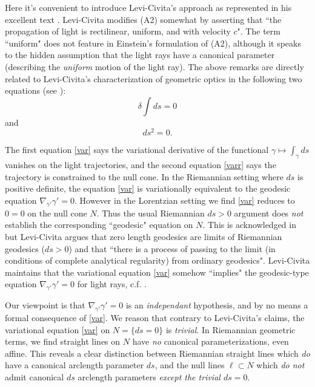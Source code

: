 \documentclass[12pt]{article}
\begin{document}
Here it's convenient to introduce Levi-Civita's approach as represented in his excellent text \cite{levi}. Levi-Civita modifies (A2) somewhat by asserting that ``the propagation of light is rectilinear, uniform, and with velocity $c$". The term ``uniform" does not feature in Einstein's formulation of (A2), although it speaks to the hidden assumption that the light rays have a canonical parameter (describing the \emph{uniform} motion of the light ray). The above remarks are directly related to Levi-Civita's characterization of geometric optics in the following two equations (see \cite[III.XI.16]{levi}): \begin{equation}
\delta \int ds=0
\label{var}\end{equation}
and
\begin{equation}
ds^2=0.
\label{varr}\end{equation}

The first equation \eqref{var} says the variational derivative of the functional $\gamma \mapsto \int_\gamma ds$ vanishes on the light trajectories, and the second equation \eqref{varr} says the trajectory is constrained to the null cone. In the Riemannian setting where $ds$ is positive definite, the equation \eqref{var} is variationally equivalent to the geodesic equation $\nabla_{\gamma'} \gamma'=0$. However in the Lorentzian setting we find \eqref{var} reduces to $0=0$ on the null cone $N$. Thus the usual Riemannian $ds>0$ argument does \emph{not} establish the corresponding ``geodesic" equation on $N$. This is acknowledged in \cite[III.XI.14]{levi} but Levi-Civita argues that zero length geodesics are limits of Riemannian geodesics ($ds>0$) and that ``there is a process of passing to the limit (in conditions of complete analytical regularity) from ordinary geodesics". Levi-Civita maintains that the variational equation \eqref{var} somehow ``implies" the geodesic-type equation $\nabla_{\gamma'} \gamma'=0$ for light rays, c.f. \cite[III.XI.18]{levi}. 

Our viewpoint is that $\nabla_{\gamma'} \gamma'=0$ is an \emph{independant} hypothesis, and by no means a formal consequence of \eqref{var}. We reason that contrary to Levi-Civita's claims, the variational equation \eqref{var} on $N=\{ds=0\}$ is \emph{trivial}. In Riemannian geometric terms,  we find straight lines on $N$ have \emph{no} canonical parameterizations, even affine. This reveals a clear distinction between Riemannian straight lines which \emph{do} have a canonical arclength parameter $ds$, and the null lines $\ell \subset N$ which \emph{do not} admit canonical $ds$ arclength parameters \emph{except the trivial $ds=0$}. 
\end{document}
